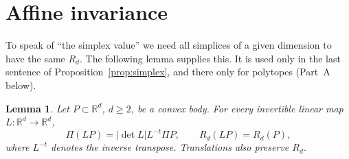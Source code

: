 \documentclass[11pt]{article}
\newtheorem{lemma}[theorem]{Lemma}
\newcommand{\R}{\mathbb R}
\begin{document}
\section{Affine invariance}\label{sec:affine}

To speak of ``the simplex value'' we need all simplices of a given
dimension to have the same \(R_d\). The following lemma supplies this.
It is used only in the last sentence of
Proposition~\ref{prop:simplex}, and there only for polytopes (Part~A
below).

\begin{lemma}\label{lem:affine}
Let \(P\subset\R^d\), \(d\ge2\), be a convex body. For every
invertible linear map \(L\colon\R^d\to\R^d\),
\[
 \Pi(LP)=|\det L|L^{-t}\Pi P,\qquad R_d(LP)=R_d(P),
\]
where \(L^{-t}\) denotes the inverse transpose. Translations also
preserve \(R_d\).
\end{lemma}
\end{document}

